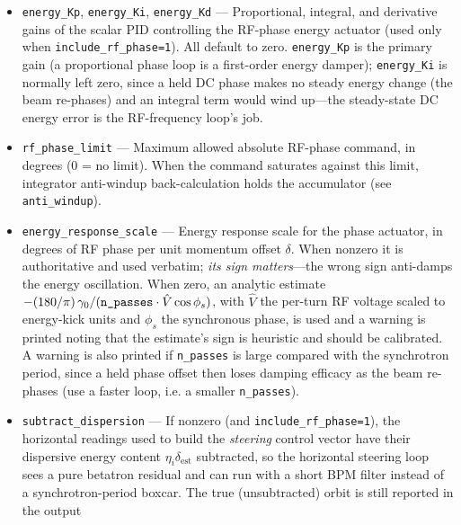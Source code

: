 \documentclass[11pt]{article}
\begin{document}
\begin{itemize}
  the main-RF phase.  Requires \verb|twiss_output| so the dispersion used in the projection
  $\delta_{\mathrm{est}}=\sum x_i\eta_i/\sum\eta_i^2$ is available.  Select the cavities with
  \verb|steering_element|, \verb|item="PHASE"|; if none are declared, every \verb|RFCA| in the
  beamline is used.  Independent of, and usable together with, the steering correctors; it is
  the longitudinal analog of the correctors, not a response-matrix column.
\item \verb|energy_Kp|, \verb|energy_Ki|, \verb|energy_Kd| --- Proportional, integral, and
  derivative gains of the scalar PID controlling the RF-phase energy actuator (used only when
  \verb|include_rf_phase=1|).  All default to zero.  \verb|energy_Kp| is the primary gain (a
  proportional phase loop is a first-order energy damper); \verb|energy_Ki| is normally left
  zero, since a held DC phase makes no steady energy change (the beam re-phases) and an
  integral term would wind up---the steady-state DC energy error is the RF-frequency loop's
  job.
\item \verb|rf_phase_limit| --- Maximum allowed absolute RF-phase command, in degrees
  (0 = no limit).  When the command saturates against this limit, integrator anti-windup
  back-calculation holds the accumulator (see \verb|anti_windup|).
\item \verb|energy_response_scale| --- Energy response scale for the phase actuator, in
  degrees of RF phase per unit momentum offset $\delta$.  When nonzero it is authoritative
  and used verbatim; \emph{its sign matters}---the wrong sign anti-damps the energy
  oscillation.  When zero, an analytic estimate
  $-(180/\pi)\,\gamma_0/(\verb|n_passes|\cdot \hat{V}\cos\phi_s)$, with $\hat{V}$ the
  per-turn RF voltage scaled to energy-kick units and $\phi_s$ the synchronous phase, is used
  and a warning is printed noting that the estimate's sign is heuristic and should be
  calibrated.  A warning is also printed if \verb|n_passes| is large compared with the
  synchrotron period, since a held phase offset then loses damping efficacy as the beam
  re-phases (use a faster loop, i.e. a smaller \verb|n_passes|).
\item \verb|subtract_dispersion| --- If nonzero (and \verb|include_rf_phase=1|), the
  horizontal readings used to build the \emph{steering} control vector have their dispersive
  energy content $\eta_i\delta_{\mathrm{est}}$ subtracted, so the horizontal steering loop
  sees a pure betatron residual and can run with a short BPM filter instead of a
  synchrotron-period boxcar.  The true (unsubtracted) orbit is still reported in the output

\end{itemize}
\end{document}
